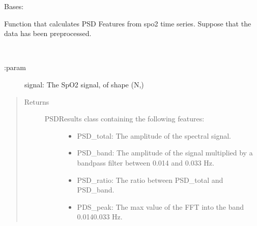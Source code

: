 \documentclass[letterpaper,10pt,english]{sphinxmanual}
\begin{document}
\begin{fulllineitems}
\label{\detokenize{pobm.obm:pobm.obm.periodicity.PSDMeasures}}
Bases: 

Function that calculates PSD Features from spo2 time series.
Suppose that the data has been preprocessed.

\begin{fulllineitems}
\label{\detokenize{pobm.obm:pobm.obm.periodicity.PSDMeasures.compute}}~\begin{description}
\item[{:param}] \leavevmode
signal: The SpO2 signal, of shape (N,)

\end{description}
\begin{quote}\begin{description}
\item[{Returns}] \leavevmode
\begin{description}
\item[{PSDResults class containing the following features:}] \leavevmode\begin{itemize}
\item {} 
PSD\_total: The amplitude of the spectral signal.

\item {} 
PSD\_band: The amplitude of the signal multiplied by a band\sphinxhyphen{}pass filter between 0.014 and 0.033 Hz.

\item {} 
PSD\_ratio: The ratio between PSD\_total and PSD\_band.

\item {} 
PDS\_peak: The max value of the FFT into the band 0.014\sphinxhyphen{}0.033 Hz.

\end{itemize}

\end{description}


\end{description}\end{quote}


\end{fulllineitems}
\end{fulllineitems}
\end{document}
